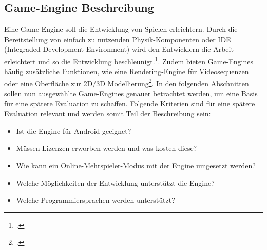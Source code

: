 \subsection{Game-Engine Beschreibung}
	Eine Game-Engine soll die Entwicklung von Spielen erleichtern. Durch die Bereitstellung von einfach zu nutzenden Physik-Komponenten oder IDE (Integraded Development Environment) wird den Entwicklern die Arbeit erleichtert und so die Entwicklung beschleunigt.\footcite[Jason Gregory - Game Engine Architecture (S.11)]{gregory2014game}. Zudem bieten Game-Engines häufig zusätzliche Funktionen, wie eine Rendering-Engine für Videosequenzen oder eine Oberfläche zur 2D/3D Modellierung\footcite[Jason Gregory - Game Engine Architecture (S. 36ff.)]{gregory2014game}.
	In den folgenden Abschnitten sollen nun ausgewählte Game-Engines genauer betrachtet werden, um eine Basis für eine spätere Evaluation zu schaffen. Folgende Kriterien sind für eine spätere Evaluation relevant und werden somit Teil der Beschreibung sein:
	\begin{itemize}
		\item{Ist die Engine für Android geeignet?}
		\item{Müssen Lizenzen erworben werden und was kosten diese?}
		\item{Wie kann ein Online-Mehrspieler-Modus mit der Engine umgesetzt werden?}
		\item{Welche Möglichkeiten der Entwicklung unterstützt die Engine?}
		\item{Welche Programmiersprachen werden unterstützt?}
	\end{itemize}

